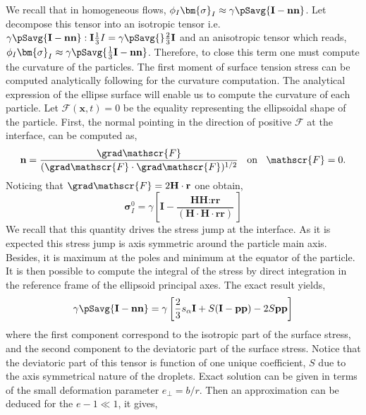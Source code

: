 We recall that in homogeneous flows, $\phi_I \bm{\sigma}_I \approx \gamma\pSavg{\textbf{I}-\textbf{nn}}$. 
Let decompose this tensor into an isotropic tensor i.e. $\gamma\pSavg{\textbf{I}-\textbf{nn}} : \textbf{I} \frac{1}{3}I = \gamma\pSavg{} \frac{2}{3} \textbf{I}$ and an anisotropic tensor which reads, $\phi_I \bm{\sigma}_I \approx \gamma\pSavg{\frac{1}{3}\textbf{I}-\textbf{nn}}$.  
Therefore, to close this term one must compute the curvature of the particles. 
The first moment of surface tension stress can be computed analytically following \citep{nadim1996concise} for the curvature computation.
The analytical expression of the ellipse surface will enable us to compute the curvature of each particle.  
Let $\mathscr{F}(\textbf{x},t) = 0$ be the equality representing the ellipsoidal shape of the particle. 
First, the normal pointing in the direction of positive $\mathscr{F}$ at the interface, can be computed as, 
\begin{equation*}
    \textbf{n} = \frac{\grad \mathscr{F}}{(\grad \mathscr{F}\cdot \grad \mathscr{F})^{1/2}} \;\;\text{ on }\;\; \mathscr{F} = 0.  
\end{equation*}
Noticing that $\grad \mathscr{F} = 2\textbf{H}\cdot \textbf{r}$ one obtain, 
\begin{equation*}
    \bm{\sigma}_I^0 =\gamma\left[
    \textbf{I} - \frac{ \textbf{HH} :  \textbf{rr}}{ (\textbf{H}\cdot  \textbf{H}\cdot \textbf{rr})} \right]
\end{equation*}
We recall that this quantity drives the stress jump at the interface. 
As it is expected this stress jump is axis symmetric around the particle main axis. 
Besides, it is maximum at the poles and minimum at the equator of the particle. 
It is then possible to compute the integral of the stress by direct integration in the reference frame of the ellipsoid principal axes. 
The exact result yields, 
\begin{equation*}
    \gamma\pSavg{\textbf{I}-\textbf{nn}}
    = \gamma \left[
        \frac{2}{3} s_\alpha \textbf{I}
        + S (\textbf{I}-\textbf{pp}) -2S\textbf{pp}
        \right]
\end{equation*}
where the first component correspond to the isotropic part of the surface stress, and the second component to the deviatoric part of the surface stress. 
Notice that the deviatoric part of this tensor is function of one unique coefficient, $S$ due to the axis symmetrical nature of the droplets. 
Exact solution can be given in terms of the small deformation parameter $e_\bot = b/r$. 
Then an approximation can be deduced for the $e -1 \ll 1$, it gives,
